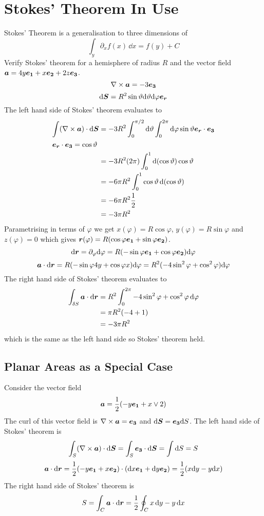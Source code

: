 \documentclass{article}
\begin{document}
    \section{Stokes' Theorem In Use}
    Stokes' Theorem is a generalisation to three dimensions of
    \[\int_y \partial_x f(x)\,\dd x = f(y) + C\]
    \example
    Verify Stokes' theorem for a hemisphere of radius \(R\) and the vector field \(\bm{a} = 4y\bm{e_{1}} + x\bm{e_{2}} + 2z\bm{e_{3}}\).
    \[\nabla\times\bm{a} = -3\bm{e_{3}}\]
    \[\dd\bm{S} = R^2\sin\vartheta\dd\vartheta\dd\varphi\bm{e_{r}}\]
    The left hand side of Stokes' theorem evaluates to
    \begin{align*}
        \int (\nabla\times\bm{a})\cdot\dd\bm{S} &= -3R^2\int_0^{\pi/2}\dd\vartheta\int_0^{2\pi}\dd\varphi\sin\vartheta\bm{e_{r}}\cdot\bm{e_{3}}\\
        \intertext{\(\bm{e_{r}}\cdot\bm{e_{3}} = \cos\vartheta\)}
        &= -3R^2(2\pi)\int_0^1\dd(\cos\vartheta) \cos\vartheta\\
        &= -6\pi R^2\int_0^1\cos\vartheta\dd(\cos\vartheta)\\
        &= -6\pi R^2\frac{1}{2}\\
        &= -3\pi R^2
    \end{align*}
    Parametrising in terms of \(\varphi\) we get \(x(\varphi) = R\cos\varphi\), \(y(\varphi) = R\sin\varphi\) and \(z(\varphi) = 0\) which gives \(\bm{r}(\varphi) = R(\cos\varphi\bm{e_{1}} + \sin\varphi\bm{e_{2}})\).
    \[\dd\bm{r} = \partial_\varphi\dd\varphi = R(-\sin\varphi\bm{e_{1}} + \cos\varphi\bm{e_{2}})\dd\varphi\]
    \[\bm{a}\cdot\dd\bm{r} = R(-\sin\varphi 4y + \cos\varphi x)\dd\varphi = R^2(-4\sin^2\varphi + \cos^2\varphi)\dd\varphi\]
    The right hand side of Stokes' theorem evaluates to
    \begin{align*}
        \int_{\delta S}\bm{a}\cdot\dd\bm{r} &= R^2\int_0^{2\pi}-4\sin^2\varphi + \cos^2\varphi\,\dd\varphi\\
        &= \pi R^2(-4 + 1)\\
        &= -3\pi R^2
    \end{align*}
    which is the same as the left hand side so Stokes' theorem held.
    
    \subsection{Planar Areas as a Special Case}
    Consider the vector field 
    \[\bm{a} = \frac{1}{2}(-y\bm{e_{1}} + x\vee 2)\]
    The curl of this vector field is \(\nabla\times\bm{a} = \bm{e_{3}}\) and \(\dd\bm{S} = \bm{e_{3}}\dd S\).
    The left hand side of Stokes' theorem is
    \[\int_S(\nabla\times\bm{a})\cdot\dd\bm{S} = \int_S\bm{e_{3}}\cdot\dd\bm{S} = \int\dd S = S\]
    \[\bm{a}\cdot\dd\bm{r} = \frac{1}{2}(-y\bm{e_{1}} + x\bm{e_{2}})\cdot(\dd x\bm{e_{1}} + \dd y\bm{e_{2}}) = \frac{1}{2}(x\dd y - y\dd x)\]
    The right hand side of Stokes' theorem is
    \begin{equation}\label{eqn:Green's theorem}
    S = \int_C\bm{a}\cdot\dd\bm{r} = \frac{1}{2}\oint_Cx\,\dd y - y\,\dd x
    \end{equation}
    
\end{document}
